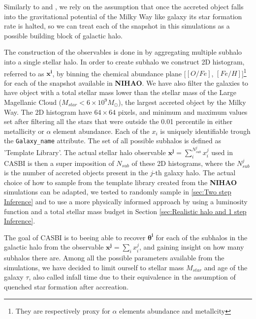 Similarly to \cite{cunninghamReadingCARDsImprint2022} and \cite{deasonUnravellingMassSpectrum2023}, we rely on the assumption that once the accreted object falls into the gravitational potential of the Milky Way like galaxy its star formation rate is halted, so we can treat each of the snapshot in this simulations as a possible building block of galactic halo. 

The construction of the observables is done in by aggregating multiple subhalo into a single stellar halo. In order to create subhalo we construct 2D histogram, referred to as \textbf{$\mathbf{x^i}$}, by binning the chemical abundance plane [$[O/Fe]$, $[Fe/H]$]\footnote{They are respectively proxy for $\alpha$ elements abundance and metallcity} for each of the snapshot available in \textbf{NIHAO}. We have also filter the galaxies to have object with a total stellar mass lower than the stellar mass of the Large Magellanic Cloud ($M_{star} < 6 \times 10^9 M_\odot$), the largest accreted object by the Milky Way. The 2D histogram have $64 \times 64$ pixels, and minimum and maximum values set after filtering all the stars that were outside the 0.01 percentile in either metallicity or $\alpha$ element abundance. Each of the $x_i$ is uniquely identifiable trough the \texttt{Galaxy\_name} attribute. The set of all possible subhalos is defined as 'Template Library'. The actual stellar halo observable \textbf{$\mathbf{x^j} = \sum_i^{N_{sub}^j} x^j_i$ } used in CASBI is then a super imposition of $N_{sub}$ of these 2D histograms, where the $N_{sub}^j$ is the number of accreted objects present in the $j$-th galaxy halo. The actual choice of how to sample from the template library created from the \textbf{NIHAO} simulations can be adapted, we tested to randomly sample in \ref{sec:Two step Inference} and to use a more physically informed approach by using a luminosity function and a total stellar mass budget in Section \ref{sec:Realistic halo and 1 step Inference}. 

  
The goal of CASBI is to beeing able to recover $\mathbf{\theta^i}$ for each of the subhalos in the galactic halo from the observable \textbf{$\mathbf{x^j}$}$=\sum_i x^j_i$, and gaining insight on how many subhalos there are. Among all the possible parameters available from the simulations, we have decided to limit ourself to stellar mass $M_{star}$ and age of the galaxy $\tau$, also called infall time due to their equivalence in the assumption of quenched star formation after accreation.  
